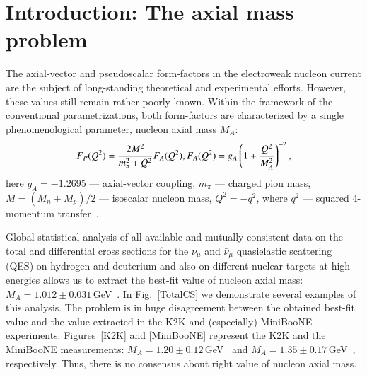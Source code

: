 \section{Introduction: The axial mass problem}
The axial-vector and pseudoscalar form-factors in the electroweak nucleon current are the subject of long-standing theoretical and experimental efforts. However, these values still remain rather poorly known. Within the framework of the conventional parametrizations, both form-factors are characterized by a single phenomenological parameter, nucleon axial mass $M_{A}$:
\begin{equation}
F_{P}(Q^{2})={}\frac{2M^{2}}{m_{\pi}^{2}+Q^{2}}F_{A}(Q^{2}),\\
F_{A}(Q^{2})={}g_{A}\left(1+\frac{Q^{2}}{M_{A}^{2}}\right)^{-2},
\label{formfactors}
\end{equation}
here $g_{A}=-1.2695$ --- axial-vector coupling, $m_{\pi}$ --- charged pion mass, $M=(M_{n}+M_{p})/2$ --- isoscalar nucleon mass, $Q^{2}=-q^{2}$, where $q^{2}$ --- squared 4-momentum transfer~\cite{Kuzmin:2007kr}.

Global statistical analysis of all available and mutually consistent data on the total and differential cross sections for the $\nu_{\mu}$ and $\bar\nu_{\mu}$ quasielastic scattering (QES) on hydrogen and deuterium and also on different nuclear targets at high energies allows us to extract the best-fit value of nucleon axial mass: $M_{A}=1.012\pm0.031$\,GeV~\cite{Kuzmin:2014}. In Fig.~\ref{TotalCS} we demonstrate several examples of this analysis. The problem is in huge disagreement between the obtained best-fit value and the value extracted in the K2K and (especially) MiniBooNE experiments. Figures~\ref{K2K} and \ref{MiniBooNE} represent the K2K and the MiniBooNE measurements: $M_{A}=1.20\pm0.12$\,GeV~\cite{Gran:2006jn} and $M_{A}=1.35\pm0.17$\,GeV~\cite{AguilarArevalo:2010zc}, respectively. Thus, there is no consensus about right value of nucleon axial mass.

